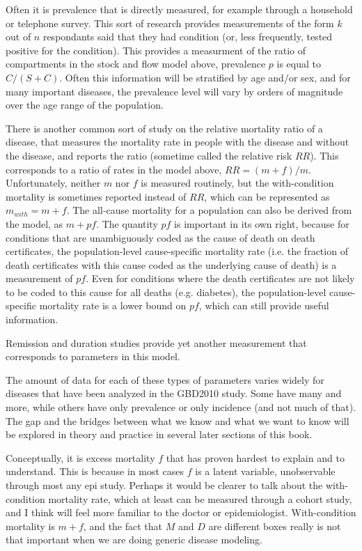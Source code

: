 Often it is prevalence that is directly measured, for example through
a household or telephone survey.  This sort of research provides
measurements of the form $k$ out of $n$ respondants said that they had
condition (or, less frequently, tested positive for the condition).
This provides a measurment of the ratio of compartments in the stock
and flow model above, prevalence $p$ is equal to $C/(S+C)$.  Often
this information will be stratified by age and/or sex, and for many
important diseases, the prevalence level will vary by orders of
magnitude over the age range of the population.

There is another common sort of study on the relative mortality ratio
of a disease, that measures the mortality rate in people with the
disease and without the disease, and reports the ratio (sometime
called the relative risk $RR$).  This corresponds to a ratio of rates in
the model above, $RR = (m+f) / m$.  Unfortunately, neither $m$ nor $f$
is measured routinely, but the with-condition mortality is sometimes
reported instead of $RR$, which can be represented as $m_{with} =
m+f$.  The all-cause mortality for a population can also be derived
from the model, as $m + pf$.  The quantity $pf$ is important in its
own right, because for conditions that are unambiguously coded as the
cause of death on death certificates, the population-level
cause-specific mortality rate (i.e. the fraction of death certificates
with this cause coded as the underlying cause of death) is a
measurement of $pf$.  Even for conditions where the death certificates
are not likely to be coded to this cause for all deaths
(e.g. diabetes), the population-level cause-specific mortality rate is
a lower bound on $pf$, which can still provide useful information.

Remission and duration studies provide yet another measurement that
corresponds to parameters in this model.

The amount of data for each of these types of parameters varies widely
for diseases that have been analyzed in the GBD2010 study. Some have
many and more, while others have only prevalence or only incidence
(and not much of that). The gap and the bridges between what we know
and what we want to know will be explored in theory and practice in
several later sections of this book.

Conceptually, it is excess mortality $f$ that has proven hardest to
explain and to understand. This is because in most cases $f$ is a
latent variable, unobservable through most any epi study. Perhaps it
would be clearer to talk about the with-condition mortality rate,
which at least can be measured through a cohort study, and I think
will feel more familiar to the doctor or
epidemiologist. With-condition mortality is $m+f$, and the fact that
$M$ and $D$ are different boxes really is not that important when we
are doing generic disease modeling.

